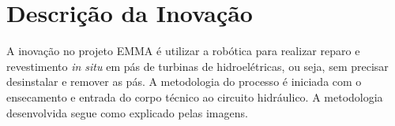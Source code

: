 
\section{Descrição da Inovação}

A inovação no projeto EMMA é utilizar a robótica para realizar reparo e
revestimento \textit{in situ} em pás de turbinas de hidroelétricas, ou seja, sem
precisar desinstalar e remover as pás. A metodologia do processo é iniciada com o
ensecamento e entrada do corpo técnico ao circuito hidráulico. A metodologia
desenvolvida segue como explicado pelas imagens.

% 
% 
% 


